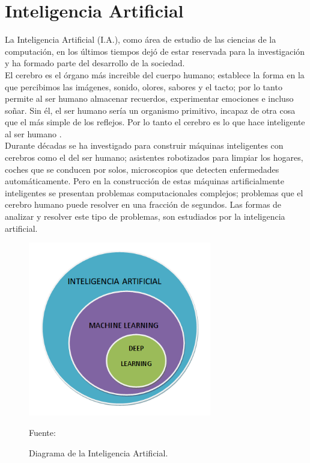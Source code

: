 \section{Inteligencia Artificial}
La Inteligencia Artificial (I.A.), como área de estudio de las ciencias de la computación, en los últimos tiempos dejó de estar reservada para la investigación y ha formado parte del desarrollo de la sociedad.\\

El cerebro es el órgano más increible del cuerpo humano; establece la forma en la que percibimos las imágenes, sonido, olores, sabores y el tacto; por lo tanto permite al ser humano almacenar recuerdos, experimentar emociones e incluso soñar. Sin él, el ser humano sería un organismo primitivo, incapaz de otra cosa que el más simple de los reflejos. Por lo tanto el cerebro es lo que hace inteligente al ser humano \cite{intro_ia}.\\

Durante décadas se ha investigado para construir máquinas inteligentes con cerebros como el del ser humano; asistentes robotizados para limpiar los hogares, coches que se conducen por solos, microscopios que detecten enfermedades automáticamente. Pero en la construcción de estas máquinas artificialmente inteligentes se presentan problemas computacionales complejos; problemas que el cerebro humano puede resolver en una fracción de segundos. Las formas de analizar y resolver este tipo de problemas, son estudiados por la inteligencia artificial.

\begin{figure}[H]
    \begin{center}
        \includegraphics[width=8cm]{img/capitulo_2/ia.png}
        \caption{Diagrama de la Inteligencia Artificial.\\}
        Fuente: \cite{ia}
        \label{fig:ia}
    \end{center}
\end{figure}

